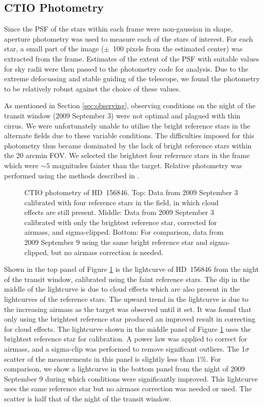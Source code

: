 \documentclass[12pt,preprint]{emulateapj}
\begin{document}
\subsection{CTIO Photometry}
\label{sec:photometry}

Since the PSF of the stars within each frame were non-gaussian in
shape, aperture photometry was used to measure each of the stars of
interest. For each star, a small part of the image ($\pm$~100 pixels
from the estimated center) was extracted from the frame. Estimates of
the extent of the PSF with suitable values for sky radii were then
passed to the photometry code for analysis. Due to the extreme
defocussing and stable guiding of the telescope, we found the
photometry to be relatively robust against the choice of these values.

As mentioned in Section \ref{sec:observing}, observing conditions on
the night of the transit window (2009 September 3) were not optimal
and plagued with thin cirrus. We were unfortunately unable to utilise
the bright reference stars in the alternate fields due to these
variable conditions. The difficulties imposed for this photometry thus
became dominated by the lack of bright reference stars within the 20
arcmin FOV. We selected the brightest four reference stars in the
frame which were $\sim 5$ magnitudes fainter than the target. Relative
photometry was performed using the methods described in \citet{eve01}.

\begin{figure}
  \caption{CTIO photometry of HD~156846. Top: Data from 2009 September
    3 calibrated with four reference stars in the field, in which
    cloud effects are still present. Middle: Data from 2009 September
    3 calibrated with only the brightest reference star, corrected
    for airmass, and sigma-clipped. Bottom: For comparison, data from
    2009 September 9 using the same bright reference star and
    sigma-clipped, but no airmass correction is needed.}
  \label{fig:phot1}
\end{figure}

Shown in the top panel of Figure \ref{fig:phot1} is the lightcurve of
HD~156846 from the night of the transit window, calibrated using the
faint reference stars. The dip in the middle of the lightcurve is due
to cloud effects which are also present in the lightcurves of the
reference stars. The upward trend in the lightcurve is due to the
increasing airmass as the target was observed until it set. It was
found that only using the brightest reference star produced an
improved result in correcting for cloud effects. The lightcurve shown
in the middle panel of Figure \ref{fig:phot1} uses the brightest
reference star for calibration. A power law was applied to correct for
airmass, and a sigma-clip was performed to remove significant
outliers. The 1$\sigma$ scatter of the measurements in this panel is
slightly less than 1\%. For comparison, we show a lightcurve in the
bottom panel from the night of 2009 September 9 during which
conditions were significantly improved. This lightcurve uses the same
reference star but no airmass correction was needed or used. The
scatter is half that of the night of the transit window.
\end{document}
